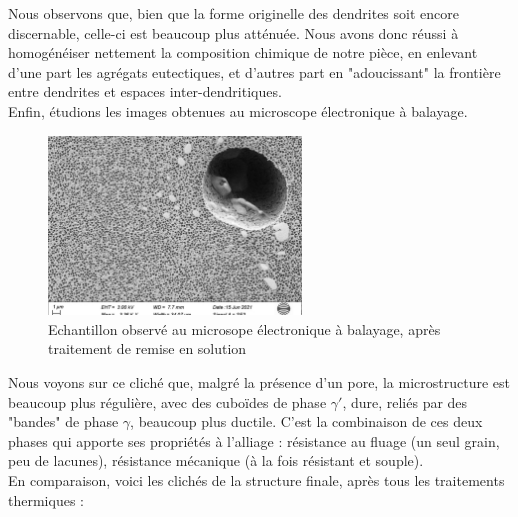Nous observons que, bien que la forme originelle des dendrites soit encore discernable, 
celle-ci est beaucoup plus atténuée. Nous avons donc réussi à homogénéiser nettement
la composition chimique de notre pièce, en enlevant d'une part les agrégats eutectiques, 
et d'autres part en "adoucissant" la frontière entre dendrites et espaces inter-dendritiques.\\


Enfin, étudions les images obtenues au microscope électronique à balayage.\\

\begin{figure}[H]
    \centering
    \includegraphics[width=0.6\textwidth]{images_meb/RS1913.pdf}
    \caption{Echantillon observé au microsope électronique à balayage, 
    après traitement de remise en solution\\}
    \label{fig:RES_MEB}
\end{figure}

Nous voyons sur ce cliché que, malgré la présence d'un pore, la microstructure
est beaucoup plus régulière, avec des cuboïdes de phase $\gamma'$, dure, reliés
par des "bandes" de phase $\gamma$, beaucoup plus ductile. C'est la combinaison 
de ces deux phases qui apporte ses propriétés à l'alliage : résistance au fluage
(un seul grain, peu de lacunes), résistance mécanique (à la fois résistant et souple).\\


En comparaison, voici les clichés de la structure finale, après tous les 
traitements thermiques :\\

